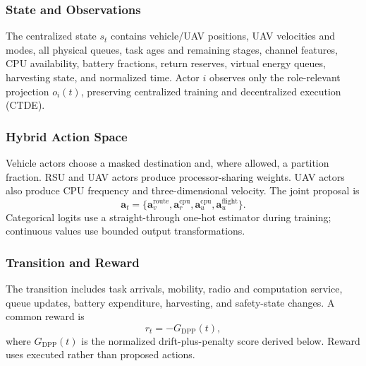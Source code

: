\documentclass[journal]{IEEEtran}
\newcommand{\vect}[1]{\boldsymbol{#1}}
\begin{document}
\subsubsection{State and Observations}
The centralized state $s_t$ contains vehicle/UAV positions, UAV velocities
and modes, all physical queues, task ages and remaining stages, channel
features, CPU availability, battery fractions, return reserves, virtual
energy queues, harvesting state, and normalized time. Actor $i$ observes only
the role-relevant projection $o_i(t)$, preserving centralized training and
decentralized execution (CTDE).

\subsubsection{Hybrid Action Space}
Vehicle actors choose a masked destination and, where allowed, a partition
fraction. RSU and UAV actors produce processor-sharing weights. UAV actors
also produce CPU frequency and three-dimensional velocity. The joint proposal
is
\begin{equation}
\vect a_t=\{\vect a_v^{\mathrm{route}},\vect a_r^{\mathrm{cpu}},
\vect a_u^{\mathrm{cpu}},\vect a_u^{\mathrm{flight}}\}.
\end{equation}
Categorical logits use a straight-through one-hot estimator during training;
continuous values use bounded output transformations.

\subsubsection{Transition and Reward}
The transition includes task arrivals, mobility, radio and computation
service, queue updates, battery expenditure, harvesting, and safety-state
changes. A common reward is
\begin{equation}
r_t=-G_{\mathrm{DPP}}(t),
\end{equation}
where $G_{\mathrm{DPP}}(t)$ is the normalized drift-plus-penalty score derived
below. Reward uses executed rather than proposed actions.
\end{document}
